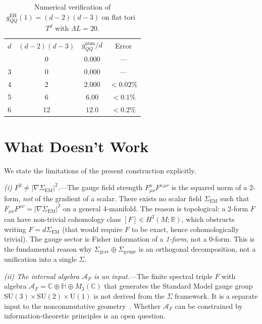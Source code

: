 \documentclass[prd,twocolumn,superscriptaddress,longbibliography]{revtex4-2}
\newcommand{\Sgrav}{\Sigma_{\mathrm{grav}}}
\newcommand{\Sgauge}{\Sigma_{\mathrm{gauge}}}
\newcommand{\AF}{\mathcal{A}_F}
\begin{document}
\begin{table}[t]
\centering
\caption{Numerical verification of
$g_{QQ}^{\mathrm{EH}}(1) = (d-2)(d-3)$
on flat tori~$T^d$ with $\Lambda L = 20$.}
\label{tab:numerical}
\begin{ruledtabular}
\begin{tabular}{cccc}
$d$ & $(d\!-\!2)(d\!-\!3)$ & $g_{QQ}^{\mathrm{num}}/d$
  & Error \\
\colrule
2  &  0 & $0.000$ & --- \\
3  &  0 & $0.000$ & --- \\
4  &  2 & $2.000$ & $<0.02\%$ \\
5  &  6 & $6.00$  & $<0.1\%$ \\
6  & 12 & $12.0$  & $<0.2\%$ \\
\end{tabular}
\end{ruledtabular}
\end{table}


\section{What Doesn't Work}
\label{sec:limitations}

We state the limitations of the present construction explicitly.

\emph{(i) $F^2 \neq |\nabla\Sigma_{\mathrm{EM}}|^2$.}---The
gauge field strength $F_{\mu\nu}^a F^{a\,\mu\nu}$ is the
squared norm of a 2-form, \emph{not} of the gradient of a
scalar.
There exists no scalar field $\Sigma_{\mathrm{EM}}$ such that
$F_{\mu\nu}F^{\mu\nu} = |\nabla\Sigma_{\mathrm{EM}}|^2$
on a general 4-manifold.
The reason is topological: a 2-form $F$ can have non-trivial
cohomology class $[F]\in H^2(M;\mathbb{R})$, which obstructs
writing $F = d\Sigma_{\mathrm{EM}}$ (that would require $F$ to be
exact, hence cohomologically trivial).
The gauge sector is Fisher information of a \emph{1-form},
not a 0-form.
This is the fundamental reason why
$\Sgrav \oplus \Sgauge$ is an orthogonal
decomposition, not a unification into a single $\Sigma$.

\emph{(ii) The internal algebra $\AF$ is an input.}---The
finite spectral triple $F$ with algebra
$\AF = \mathbb{C}\oplus\mathbb{H}\oplus M_3(\mathbb{C})$
that generates the Standard Model gauge group
$\mathrm{SU}(3)\times\mathrm{SU}(2)\times\mathrm{U}(1)$
is not derived from the $\Sigma$ framework.
It is a separate input to the noncommutative
geometry~\cite{CCM2007,ConnesMarcolli2008}.
Whether $\AF$ can be constrained by information-theoretic
principles is an open question.
\end{document}
